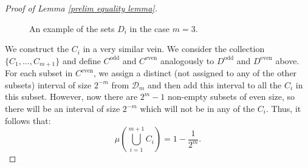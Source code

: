 \documentclass[12pt]{article}
\begin{document}
\begin{proof}[Proof of Lemma \ref{prelim equality lemma}]
\begin{figure}[!ht]
    \caption{An example of the sets $D_i$ in the case $m=3$.}
    \label{leb construction Di}
\begin{center}
\end{center}
\label{Di set example m=3}
\end{figure}
    
    We construct the $C_i$ in a very similar vein. 
    We consider the collection $\{ C_1,...,C_{m+1} \}$ and define $C^{\textrm{odd}}$ and $C^{\textrm{even}}$ analogously to $D^{\textrm{odd}}$ and $D^{\textrm{even}}$ above. For each subset in $C^{\textrm{even}}$, we assign a distinct (not assigned to any of the other subsets) interval of size $2^{-m}$ from $\mathcal{D}_m$ and then add this interval to all the $C_i$ in this subset. However, now there are $2^m-1$ non-empty subsets of even size, so there will be an interval of size $2^{-m}$ which will not be in any of the $C_i$. Thus, it follows that:
     \[\mu \left( \bigcup_{i=1}^{m+1} C_i \right) =1-\frac{1}{2^m}.\]



\end{proof}
\end{document}
